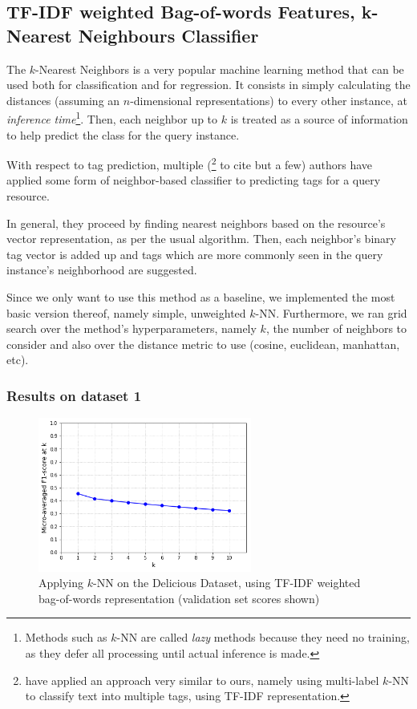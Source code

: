 \subsection{TF-IDF weighted Bag-of-words Features, k-Nearest Neighbours Classifier}

The $k$-Nearest Neighbors is a very popular machine learning method that can be used both for classification and for regression. It consists in simply calculating the distances (assuming an $n$-dimensional representations) to every other instance, at \textit{inference time}\footnote{Methods such as $k$-NN are called \textit{lazy} methods because they need no training, as they defer all processing until actual inference is made.}. Then, each neighbor up to $k$ is treated as a source of information to help predict the class for the query instance. 

With respect to tag prediction, multiple (\cite{martinez_etal_2009,chidlovskii_2012,zhang_etal_2015,charte_etal_2015}\footnote{\cite{charte_etal_2015} have applied an approach very similar to ours, namely using multi-label $k$-NN to classify text into multiple tags, using TF-IDF representation. } to cite but a few) authors have applied some form of neighbor-based classifier to predicting tags for a query resource. 

In general, they proceed by finding nearest neighbors based on the resource's vector representation, as per the usual algorithm. Then, each neighbor's binary tag vector is added up and tags which are more commonly seen in the query instance's neighborhood are suggested.

Since we only want to use this method as a baseline, we implemented the most basic version thereof, namely simple, unweighted $k$-NN. Furthermore, we ran grid search over the method's hyperparameters, namely $k$, the number of neighbors to consider and also over the distance metric to use (cosine, euclidean, manhattan, etc).

\subsubsection{Results on dataset 1}

\begin{figure}[H]
    \centering
    \includegraphics[width=7cm]{chapters/05_experiments/images/knn-tfidf-delicious.png}
    \caption{Applying $k$-NN on the Delicious Dataset, using TF-IDF weighted bag-of-words representation (validation set scores shown)}
    \label{fig:knn__movielens}
\end{figure}

